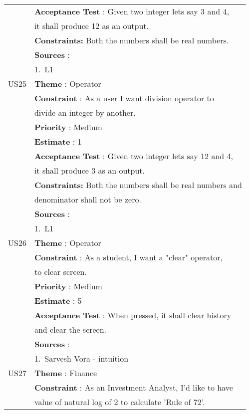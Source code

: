 \documentclass{article}
\begin{document}
\begin{longtable}{|| c || l ||}
         & \textbf{Acceptance Test} : Given two integer lets say 3 and 4, \\
         & it shall produce 12 as an output.\\
         & \textbf{Constraints: } Both the numbers shall be real numbers.\\
         & \textbf{Sources} : \\
         & 1.~L1 \\
         \hline
         \newpage
         \hline
         US25 & \textbf{Theme} : Operator \\
         & \textbf{Constraint} : As a user I want division operator to \\
         & divide an integer by another.\\
         & \textbf{Priority} : Medium \\
         & \textbf{Estimate} : 1 \\
         & \textbf{Acceptance Test} : Given two integer lets say 12 and 4,\\
         & it shall produce 3 as an output.\\
         & \textbf{Constraints: } Both the numbers shall be real numbers and \\
         & denominator shall not be zero.\\
         & \textbf{Sources} : \\
         & 1.~L1 \\
         \hline
         US26 & \textbf{Theme} : Operator \\
         & \textbf{Constraint} : As a student, I want a "clear" operator,\\
         & to clear screen.\\
         & \textbf{Priority} : Medium \\
         & \textbf{Estimate} : 5 \\
         & \textbf{Acceptance Test} : When pressed, it shall clear history\\
         & and clear the screen.\\
         & \textbf{Sources} : \\
         & 1.~Sarvesh Vora - intuition \\
         \hline
         \hline
         US27 & \textbf{Theme} : Finance \\
         & \textbf{Constraint} : As an Investment Analyst, I'd like to have \\
         & value of natural log of 2 to calculate 'Rule of 72'.\\

\end{longtable}
\end{document}
